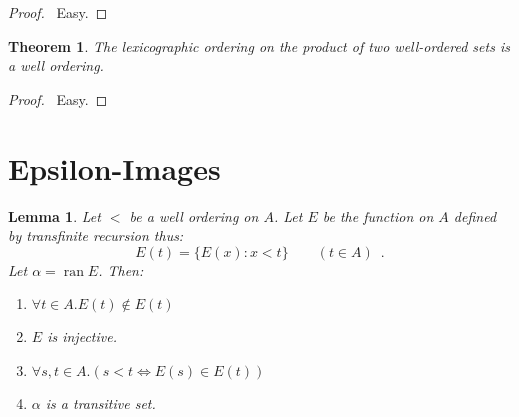 \documentclass{article}
\let\qed\relax
\newtheorem{lemma}[axiom]{Lemma}
\newtheorem{theorem}[axiom]{Theorem}
\theoremstyle{definition}
\newcommand{\ran}{\ensuremath{\operatorname{ran}}}
\begin{document}
    \begin{proof}
        \pf\ Easy. \qed
    \end{proof}

    \begin{theorem}
        The lexicographic ordering on the product of two well-ordered sets is a well ordering.
    \end{theorem}

    \begin{proof}
        \pf\ Easy. \qed
    \end{proof}

    \section{Epsilon-Images}

    \begin{lemma}
        \label{lemma:epsilon_image}
        Let $<$ be a well ordering on $A$. Let $E$ be the function on $A$ defined by transfinite recursion
        thus:
        \[ E(t) = \{ E(x) : x < t \} \qquad (t \in A) \enspace . \]
        Let $\alpha = \ran E$. Then:
        \begin{enumerate}
            \item $\forall t \in A. E(t) \notin E(t)$
            \item $E$ is injective.
            \item $\forall s,t \in A. (s < t \Leftrightarrow E(s) \in E(t))$
            \item $\alpha$ is a transitive set.
        \end{enumerate}
    \end{lemma}
\end{document}
